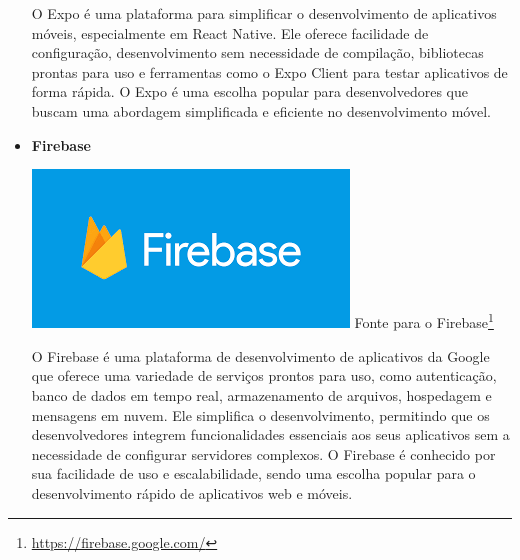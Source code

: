 \begin{itemize}
O Expo é uma plataforma para simplificar o desenvolvimento de aplicativos móveis, especialmente em React Native. Ele oferece facilidade de configuração, desenvolvimento sem necessidade de compilação, bibliotecas prontas para uso e ferramentas como o Expo Client para testar aplicativos de forma rápida. O Expo é uma escolha popular para desenvolvedores que buscam uma abordagem simplificada e eficiente no desenvolvimento móvel.

    \item \textbf{Firebase}
    \begin{center}
    \includegraphics[width=0.5\linewidth]{figuras/Firebase.png}
    \label{fig:Firebase}
    Fonte para o Firebase\footnote{\url{https://firebase.google.com/}}
\end{center}

O Firebase é uma plataforma de desenvolvimento de aplicativos da Google que oferece uma variedade de serviços prontos para uso, como autenticação, banco de dados em tempo real, armazenamento de arquivos, hospedagem e mensagens em nuvem. Ele simplifica o desenvolvimento, permitindo que os desenvolvedores integrem funcionalidades essenciais aos seus aplicativos sem a necessidade de configurar servidores complexos. O Firebase é conhecido por sua facilidade de uso e escalabilidade, sendo uma escolha popular para o desenvolvimento rápido de aplicativos web e móveis.


\end{itemize}
